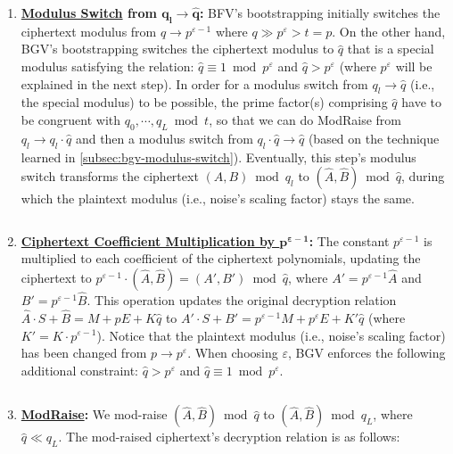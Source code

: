 \begin{enumerate}

\item \textbf{\underline{Modulus Switch} from $\bm{q_l \rightarrow \hat{q}}$:} BFV's bootstrapping initially switches the ciphertext modulus from $q \rightarrow p^{\varepsilon-1}$ where $q \gg p^\varepsilon > t = p$. On the other hand, BGV's bootstrapping switches the ciphertext modulus to $\hat{q}$ that is a special modulus satisfying the relation: $\hat{q} \equiv 1 \bmod p^\varepsilon$ and $\hat{q} > p^\varepsilon$ (where $p^\varepsilon$ will be explained in the next step). In order for a modulus switch from $q_l \rightarrow \hat{q}$ (i.e., the special modulus) to be possible, the prime factor(s) comprising $\hat{q}$ have to be congruent with $q_{0}, \cdots, q_L \bmod t$, so that we can do \textsf{ModRaise} from $q_l \rightarrow q_l\cdot \hat{q}$ and then a modulus switch from $q_l\cdot \hat{q} \rightarrow \hat{q}$ (based on the technique learned in \autoref{subsec:bgv-modulus-switch}). Eventually, this step's modulus switch transforms the ciphertext $(A, B) \bmod q_l$ to $(\hat{A}, \hat{B}) \bmod \hat{q}$, during which the plaintext modulus (i.e., noise's scaling factor) stays the same. 

$ $

\item \textbf{\underline{Ciphertext Coefficient Multiplication by $\bm{p^{\varepsilon-1}}$}:} 
The constant $p^{\varepsilon-1}$ is multiplied to each coefficient of the ciphertext polynomials, updating the ciphertext to $p^{\varepsilon-1} \cdot (\hat{A}, \hat{B}) = (A', B') \bmod \hat{q}$, where $A' = p^{\varepsilon-1}\hat{A}$ and $B' = p^{\varepsilon-1}\hat{B}$. This operation updates the original decryption relation $\hat{A}\cdot S + \hat{B} = M + p E + K\hat{q}$ to $A'\cdot S + B' = p^{\varepsilon-1} M + p^\varepsilon E + K'\hat{q}$ (where $K' = K \cdot p^{\varepsilon - 1}$). Notice that the plaintext modulus (i.e., noise's scaling factor) has been changed from $p \rightarrow p^\varepsilon$. When choosing $\varepsilon$, BGV enforces the following additional constraint: $\hat{q} > p^\varepsilon$ and $\hat{q}  \equiv 1 \bmod p^\varepsilon$.

$ $

\item \textbf{\underline{\textsf{ModRaise}}:} We mod-raise $(\hat{A}, \hat{B}) \bmod \hat{q}$ to $(\hat{A}, \hat{B}) \bmod q_L$, where $\hat{q} \ll q_L$. The mod-raised ciphertext's decryption relation is as follows:


\end{enumerate}
